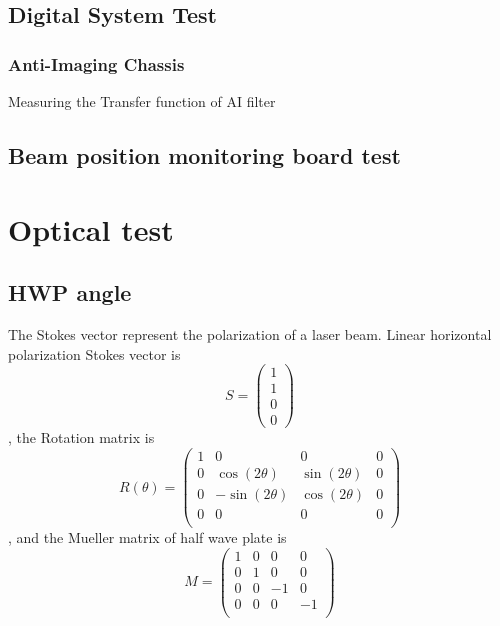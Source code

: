 \subsection{Digital System Test}
    \subsubsection{Anti-Imaging Chassis}
    Measuring the Transfer function of AI filter


\subsection{Beam position monitoring board test}

\section{Optical test}
\subsection{HWP angle}
The Stokes vector represent the polarization of a laser beam. Linear horizontal polarization Stokes vector is 
\begin{equation}
S = 
\begin{pmatrix}
1\\
1\\
0\\
0
\end{pmatrix}
\end{equation}
, the Rotation matrix is
\begin{equation}
R(\theta) = 
\begin{pmatrix}
1 & 0 & 0 & 0 \\
0 & \cos(2\theta) & \sin(2\theta) & 0 \\
0 & -\sin(2\theta) & \cos(2\theta) & 0 \\
0 & 0 & 0 & 0 \\
\end{pmatrix}
\end{equation}
, and the Mueller matrix of half wave plate is 
\begin{equation}
M = 
\begin{pmatrix}
1 & 0 & 0 & 0 \\
0 & 1 & 0 & 0 \\
0 & 0 & -1 & 0 \\
0 & 0 & 0 & -1 \\
\end{pmatrix}
\end{equation}

